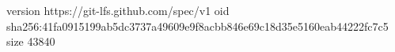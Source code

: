 version https://git-lfs.github.com/spec/v1
oid sha256:41fa0915199ab5dc3737a49609e9f8acbb846e69c18d35e5160eab44222fc7c5
size 43840
